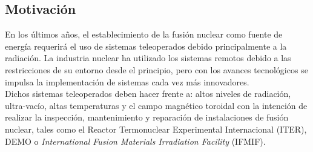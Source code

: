 \subsection*{Motivación}
En los últimos años, el establecimiento de la fusión nuclear como fuente de energía requerirá el uso de sistemas teleoperados debido principalmente a la radiación. La industria nuclear ha utilizado los sistemas remotos debido a las restricciones de su entorno desde el principio, pero con los avances tecnológicos se impulsa la implementaci\'on de sistemas cada vez m\'as innovadores.\\

  
Dichos sistemas teleoperados deben hacer frente a: altos niveles de radiación, ultra-vacío, altas temperaturas y el campo magnético toroidal con la intención de realizar la inspección, mantenimiento y reparación de instalaciones de fusión nuclear, tales como el Reactor Termonuclear Experimental Internacional (ITER), DEMO o \textit{International Fusion Materials Irradiation Facility} (IFMIF).

